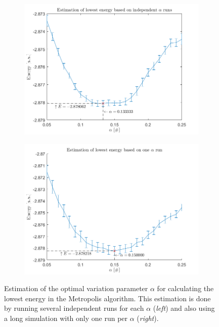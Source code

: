 \begin{figure}[H]
	\centering
	\captionsetup[subfigure]{justification=centering}
	\begin{subfigure}[b]{0.48\textwidth}
		\centering
		\includegraphics[width=\textwidth]{graphics/task3/lowest_energy_indep_alpha.png}
	\end{subfigure}
	\begin{subfigure}[b]{0.48\textwidth}
		\centering
		\includegraphics[width=\textwidth]{graphics/task3/lowest_energy_one_alpha_run.png}
	\end{subfigure}
	\caption{Estimation of the optimal variation parameter $\alpha$ for calculating the lowest energy in the Metropolis algorithm. This estimation is done by running several independent runs for each $\alpha$ (\textit{left}) and also using a long simulation with only one run per $\alpha$ (\textit{right}).}
	\label{fig:optimize_alpha}
\end{figure}

